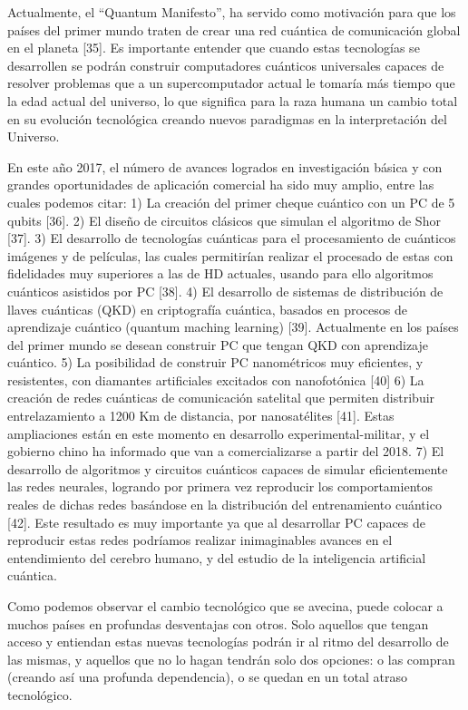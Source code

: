 Actualmente, el “Quantum Manifesto”, ha servido como motivación para que los países del primer mundo traten de crear una red cuántica de comunicación global en el planeta [35]. Es importante entender que cuando estas tecnologías se desarrollen se podrán construir computadores cuánticos universales capaces de resolver problemas que a un supercomputador actual le tomaría más tiempo que la edad actual del universo, lo que significa para la raza humana un cambio total en su evolución tecnológica creando nuevos paradigmas en la interpretación del Universo.

En este año 2017, el número de avances logrados en investigación básica y con grandes oportunidades de aplicación comercial ha sido muy amplio, entre las cuales podemos citar:
1) La creación del primer cheque cuántico con un PC de 5 qubits [36].
2) El diseño de circuitos clásicos que simulan el algoritmo de Shor [37].
3) El desarrollo de tecnologías cuánticas para el procesamiento de cuánticos imágenes y de películas, las cuales
permitirían realizar el procesado de estas con fidelidades muy superiores a las de HD actuales, usando para ello
algoritmos cuánticos asistidos por PC [38].
4) El desarrollo de sistemas de distribución de llaves cuánticas (QKD) en criptografía cuántica, basados en procesos
de aprendizaje cuántico (quantum maching learning) [39]. Actualmente en los países del primer mundo se desean
construir PC que tengan QKD con aprendizaje cuántico.
5) La posibilidad de construir PC nanométricos muy eficientes, y resistentes, con diamantes artificiales excitados
con nanofotónica [40]
6) La creación de redes cuánticas de comunicación satelital que permiten distribuir entrelazamiento a 1200 Km de
distancia, por nanosatélites [41]. Estas ampliaciones están en este momento en desarrollo experimental-militar, y el
gobierno chino ha informado que van a comercializarse a partir del 2018.
7) El desarrollo de algoritmos y circuitos cuánticos capaces de simular eficientemente las redes neurales, logrando
por primera vez reproducir los comportamientos reales de dichas redes basándose en la distribución del
entrenamiento cuántico [42]. Este resultado es muy importante ya que al desarrollar PC capaces de reproducir estas
redes podríamos realizar inimaginables avances en el entendimiento del cerebro humano, y del estudio de la
inteligencia artificial cuántica.

Como podemos observar el cambio tecnológico que se avecina, puede colocar a muchos países en profundas desventajas con otros. Solo aquellos que tengan acceso y entiendan estas nuevas tecnologías podrán ir al ritmo del desarrollo de las mismas, y aquellos que no lo hagan tendrán solo dos opciones: o las compran (creando así una profunda dependencia), o se quedan en un total atraso tecnológico.

